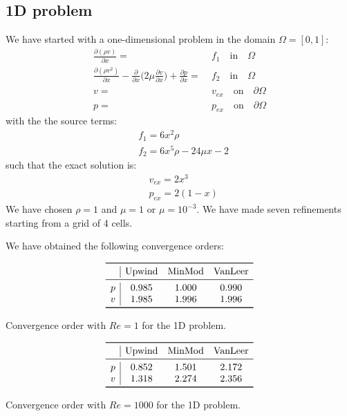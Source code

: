 \documentclass[11pt, a4paper]{article}
\theoremstyle{definition}
\begin{document}
\subsection{1D problem}
We have started with a one-dimensional problem in the domain $\Omega = [0,1]$:
\begin{align*}
\frac{ \partial (\rho v)}{\partial x} =& \; f_1 \quad \text{in} \quad \Omega\\
\frac{ \partial (\rho v^2)}{\partial x} - \frac{ \partial}{\partial x} \bigg (2 
\mu 
\frac{\partial v}{\partial x} \bigg) + \frac{\partial p}{\partial x} =& \; f_2 
\quad 
\text{in} \quad \Omega\\
v =& \; v_{ex} \quad \text{on} \quad \partial \Omega\\
p =& \; p_{ex} \quad \text{on} \quad \partial \Omega
\end{align*}
with the the source terms:
\begin{align*}
&f_1 = 6 x^2 \rho\\
&f_2 = 6 x^5 \rho - 24 \mu x - 2
\end{align*}
such that the exact solution is:
\begin{align*}
&v_{ex} = 2 x^3\\
&p_{ex} = 2 (1 - x)
\end{align*}
We have chosen $\rho = 1$ and $\mu = 1$ or $\mu = 10^{-3}$.
We have made seven refinements starting from a grid of 4 cells.

We have obtained the following convergence orders:
\begin{table}[h]
	\centering
	\[
	\begin{array}{c|ccc}
	\toprule
	& \text{Upwind} & \text{MinMod} & \text{VanLeer} \\ 
	\midrule
	p & 0.985 & 1.000 & 0.990\\
	v & 1.985 & 1.996 & 1.996\\
	\bottomrule
	\end{array}
	\]
	\caption{Convergence order with $Re = 1$ for the 1D problem.}
	\label{tab:1d_lre}

	\[
	\begin{array}{c|ccc}
	\toprule
	& \text{Upwind} & \text{MinMod} & \text{VanLeer} \\ 
	\midrule
	p & 0.852 & 1.501 & 2.172\\
	v & 1.318 & 2.274 & 2.356\\
	\bottomrule
	\end{array}
	\]
	\caption{Convergence order with $Re = 1000$ for the 1D problem.}
	\label{tab:1d_hre}
\end{table}
\end{document}

